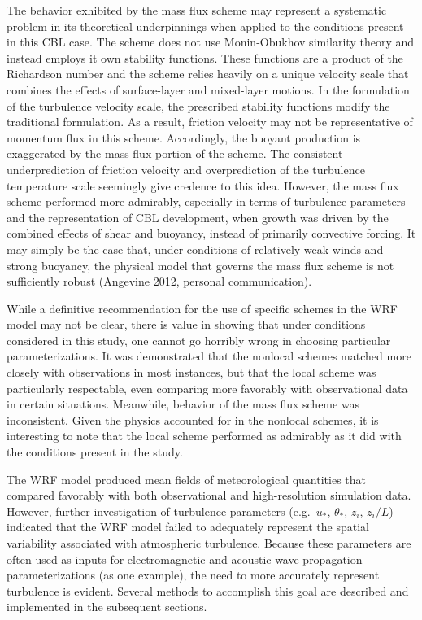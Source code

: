 The behavior exhibited by the mass flux scheme may represent a systematic problem in its theoretical underpinnings when applied to the conditions present in this CBL case. The scheme does not use Monin-Obukhov similarity theory and instead employs it own stability functions. These functions are a product of the Richardson number and the scheme relies heavily on a unique velocity scale that combines the effects of surface-layer and mixed-layer motions. In the formulation of the turbulence velocity scale, the prescribed stability functions modify the traditional formulation. As a result, friction velocity may not be representative of momentum flux in this scheme. Accordingly, the buoyant production is exaggerated by the mass flux portion of the scheme. The consistent underprediction of friction velocity and overprediction of the turbulence temperature scale seemingly give credence to this idea. However, the mass flux scheme performed more admirably, especially in terms of turbulence parameters and the representation of CBL development, when growth was driven by the combined effects of shear and buoyancy, instead of primarily convective forcing. It may simply be the case that, under conditions of relatively weak winds and strong buoyancy, the physical model that governs the mass flux scheme is not sufficiently robust (Angevine 2012, personal communication). 

While a definitive recommendation for the use of specific schemes in the WRF model may not be clear, there is value in showing that under conditions considered in this study, one cannot go horribly wrong in choosing particular parameterizations. It was demonstrated that the nonlocal schemes matched more closely with observations in most instances, but that the local scheme was particularly respectable, even comparing more favorably with observational data in certain situations. Meanwhile, behavior of the mass flux scheme was inconsistent. Given the physics accounted for in the nonlocal schemes, it is interesting to note that the local scheme performed as admirably as it did with the conditions present in the study. 

The WRF model produced mean fields of meteorological quantities that compared favorably with both observational and high-resolution simulation data. However, further investigation of turbulence parameters (e.g.\ $u_*$, $\theta_*$, $z_i$, $z_i/L$) indicated that the WRF model failed to adequately represent the spatial variability associated with atmospheric turbulence. Because these parameters are often used as inputs for electromagnetic and acoustic wave propagation parameterizations (as one example), the need to more accurately represent turbulence is evident. Several methods to accomplish this goal are described and implemented in the subsequent sections.

